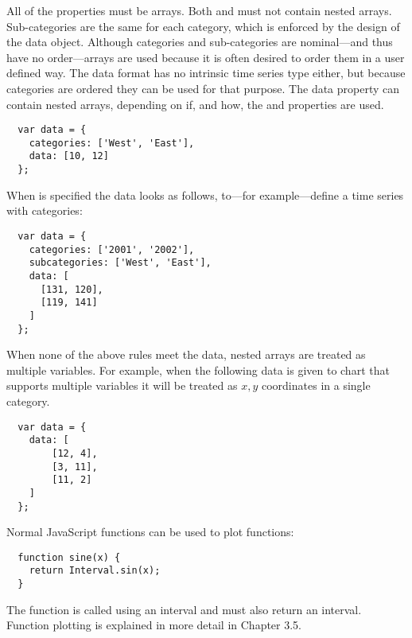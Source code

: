 All of the properties must be arrays. Both  and  must not contain nested arrays. Sub-categories are the same for each category, which is enforced by the design of the data object. Although categories and sub-categories are nominal---and thus have no order---arrays are used because it is often desired to order them in a user defined way. The data format has no intrinsic time series type either, but because categories are ordered they can be used for that purpose. The data property can contain nested arrays, depending on if, and how, the  and  properties are used.
\begin{verbatim}
  var data = {
    categories: ['West', 'East'],
    data: [10, 12]
  };
\end{verbatim}

When  is specified the data looks as follows, to---for example---define a time series with categories:
\begin{verbatim}
  var data = {
    categories: ['2001', '2002'],
    subcategories: ['West', 'East'],
    data: [
      [131, 120],
      [119, 141]
    ]
  };
\end{verbatim}

When none of the above rules meet the data, nested arrays are treated as multiple variables. For example, when the following data is given to chart that supports multiple variables it will be treated as $x, y$ coordinates in a single category.

\begin{verbatim}
  var data = {
    data: [
        [12, 4],
        [3, 11],
        [11, 2]
    ]
  };
\end{verbatim}

Normal JavaScript functions can be used to plot functions:

\begin{verbatim}
  function sine(x) {
    return Interval.sin(x);
  }
\end{verbatim}

The function is called using an interval and must also return an interval. Function plotting is explained in more detail in Chapter 3.5.
